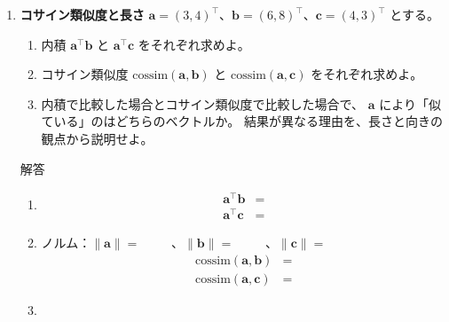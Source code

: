 \documentclass[a4paper,dvipdfmx]{jsarticle}
\newcommand{\学籍番号}{0000000}
\newcommand{\氏名}{氏名を書く}
\newcommand{\提出日}{2026年10月8日}
\newenvironment{answer}{\begin{itembox}[l]{解答}}{\end{itembox}}
\begin{document}
\begin{enumerate}
  \item \textbf{コサイン類似度と長さ}\quad
    $\bm{a} = (3, 4)^\top$、$\bm{b} = (6, 8)^\top$、$\bm{c} = (4, 3)^\top$ とする。
    \begin{enumerate}
      \item 内積 $\bm{a}^\top \bm{b}$ と $\bm{a}^\top \bm{c}$ をそれぞれ求めよ。
      \item コサイン類似度 $\mathrm{cossim}(\bm{a}, \bm{b})$ と
        $\mathrm{cossim}(\bm{a}, \bm{c})$ をそれぞれ求めよ。
      \item 内積で比較した場合とコサイン類似度で比較した場合で、
        $\bm{a}$ により「似ている」のはどちらのベクトルか。
        結果が異なる理由を、長さと向きの観点から説明せよ。
    \end{enumerate}
    \begin{answer}
      \begin{enumerate}
        \item
          \begin{align*}
            \bm{a}^\top \bm{b} &= \\
            \bm{a}^\top \bm{c} &=
          \end{align*}
        \item ノルム：$\|\bm{a}\| = \phantom{XXX}$、$\|\bm{b}\| = \phantom{XXX}$、$\|\bm{c}\| = \phantom{XXX}$
          \begin{align*}
            \mathrm{cossim}(\bm{a}, \bm{b}) &= \\
            \mathrm{cossim}(\bm{a}, \bm{c}) &=
          \end{align*}
        \item
      \end{enumerate}
    \end{answer}


\end{enumerate}
\end{document}
